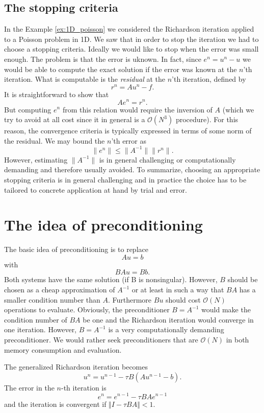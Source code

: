 \subsection{The stopping criteria}
In the Example \ref{ex:1D_poisson}  we 
considered the Richardson iteration applied
to a Poisson problem in 1D. We saw that in order to stop
the iteration we had to choose a stopping criteria. Ideally
we would like to stop when the error was small enough.
The problem is that the error is uknown. 
In fact, since $e^n = u^n - u$ we would be able to compute
the exact solution if the error was known at the $n$'th iteration. 
What is computable is the \textit{residual} at the $n$'th iteration, defined
by 
\[
r^n = A u^n - f .  
\]
It is straightforward to show that 
\[
A e^n = r^n . 
\]
But computing $e^n$ from this relation would require the inversion of
$A$ (which we try to avoid at all cost since it in general is a $\mathcal{O}(N^3)$ procedure). For this reason, the convergence criteria is typically
expressed in terms of some norm of the residual.     
We may bound the $n$'th error as  
\[
\|e^n\| \le \|A^{-1}\| \|r^n\| .   
\]
However, estimating $\|A^{-1}\|$ is in general challenging or 
computationally demanding and therefore usually avoided.   
To summarize, choosing an appropriate stopping criteria 
is in general challenging and in practice the choice has to be tailored
to concrete application at hand by trial and error. 


\section{The idea of preconditioning}
The basic idea of preconditioning is to replace 
\[
Au = b
\] 
with 
\[
BAu = Bb. 
\]
Both systems have the same solution (if B is nonsingular). However, $B$ should be 
chosen as a cheap approximation of $A^{-1}$ or at least in such a way 
that $BA$ has a smaller condition number than $A$.   
Furthermore $Bu$ should cost $\mathcal{O}(N)$ operations to evaluate. 
Obviously, the  preconditioner $B=A^{-1}$ would make the condition 
number of $BA$ be one and the Richardson iteration would converge in one iteration.   
However, $B=A^{-1}$ is a very computationally demanding preconditioner.  
We would rather seek preconditioners that are  $\mathcal{O}(N)$ 
in both memory consumption and evaluation. 

The generalized Richardson iteration becomes\\


\begin{equation}
\label{eq:Richardson_generalized}
u^n = u^{n-1} - \tau B(A u^{n-1} - b).
\end{equation}
The error in the $n$-th iteration is 
\[
e^n = e^{n-1} - \tau BAe^{n-1}
\]
and the iteration is convergent if $\Vert I - \tau BA\Vert < 1$.

